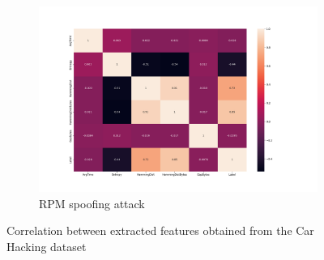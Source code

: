 \begin{figure}
    \begin{subfigure}[b]{.6\linewidth}
        \centering
        \includegraphics[width = \linewidth]{img/parts/app/feature_correlation/car_hacking/rpm.png}
        \caption{RPM spoofing attack}
        \label{subfig:apdx_fe_car_hacking_rpm}
    \end{subfigure}
    
    \caption{Correlation between extracted features obtained from the Car Hacking dataset}
    \label{fig:apdx_fe_car_hacking}
\end{figure}

